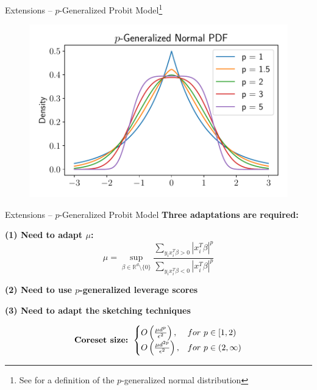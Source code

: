 \documentclass[gray]{beamer}
\begin{document}
\begin{frame}{Extensions -- $p$-Generalized Probit
        Model\footnote{See \cite{KalkeR13} for a definition of the $p$-generalized normal distribution}}
    \begin{figure}[ht!]
        \centering
        \includegraphics[width=\linewidth]{../figures/p_gen_pdf.pdf}
    \end{figure}
\end{frame}

\begin{frame}{Extensions -- $p$-Generalized Probit Model}
    \textbf{Three adaptations are required:}

    \vspace{\fill}

    \textbf{(1) Need to adapt $\mu$:}
    \begin{equation*}
        \mu = \sup_{\beta \in \mathbb{R}^d \setminus \{0\} }
        \frac{\sum_{y_ix_i^T\beta > 0} |x_i^T \beta|^p}
        {\sum_{y_ix_i^T\beta < 0}|x_i^T \beta|^p}
    \end{equation*}

    \vspace{\fill}

    \textbf{(2) Need to use $p$-generalized leverage scores}

    \vspace{\fill}

    \textbf{(3) Need to adapt the sketching techniques}

    \vspace{\fill}

    \begin{equation*}
        \text{\textbf{Coreset size:} } \begin{cases}
            O\left(\frac{\mu d^p}{\epsilon^2}\right),    & for\ p \in [1, 2)      \\
            O\left(\frac{\mu d^{2p}}{\epsilon^2}\right), & for\ p \in (2, \infty)
        \end{cases}
    \end{equation*}
\end{frame}
\end{document}
